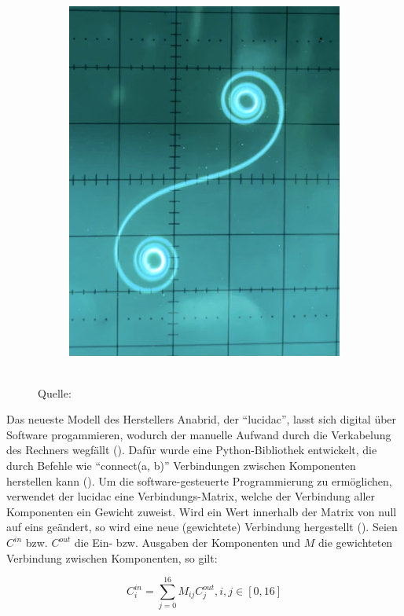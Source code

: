 \begin{figure}[h]
\begin{subfigure}{.2\textwidth}
    \includegraphics[width=\textwidth]{abbildungen/euler_spirale_ausgabe.jpg}\par
  \end{subfigure}
  \\
  Quelle: \cite{TheAnalogThingDocs}
\end{figure}

Das neueste Modell des Herstellers Anabrid, der "`lucidac"', lasst sich digital über Software progammieren, wodurch der manuelle Aufwand durch die Verkabelung des Rechners wegfällt (\cite[vgl.]{AnabridLucidAC2025}). Dafür wurde eine Python-Bibliothek entwickelt, die durch Befehle wie "`connect(a, b)"' Verbindungen zwischen Komponenten herstellen kann (\cite[vgl.]{AnabridLucipy}). Um die software-gesteuerte Programmierung zu ermöglichen, verwendet der lucidac eine Verbindungs-Matrix, welche der Verbindung aller Komponenten ein Gewicht zuweist. Wird ein Wert innerhalb der Matrix von null auf \zb eins geändert, so wird eine neue (gewichtete) Verbindung hergestellt (\cite{AnabridLucidAC2025}). Seien \(C^{in}\) bzw. \(C^{out}\) die Ein- bzw. Ausgaben der Komponenten und \(M\) die gewichteten Verbindung zwischen Komponenten, so gilt:

\[C_i^{in}=\sum_{j=0}^{16}M_{ij}C_j^{out}, i,j\in[0,16]\]
